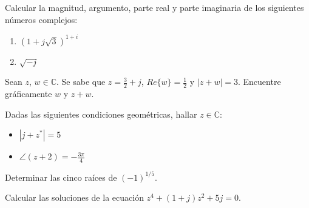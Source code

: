 \begin{ejercicio}
    Calcular la magnitud, argumento, parte real y parte imaginaria de los siguientes números complejos:
    \begin{enumerate}
        \item $(1+j\sqrt{3})^{1+i}$
        \item $\sqrt{-j}$
    \end{enumerate}
\end{ejercicio}

\begin{ejercicio}
    Sean $z$, $w \in \mathbb{C}$. Se sabe que $z=\frac{3}{2}+j$, $\textit{Re}\{w\} = \frac{1}{2}$ y $|z+w|=3$. Encuentre gráficamente $w$ y $z+w$.
\end{ejercicio}

\begin{ejercicio}
    Dadas las siguientes condiciones geométricas, hallar $z \in \mathbb{C}$:
    \begin{itemize}
        \item $|j+z^*| = 5$
        \item $\angle(z+2) = -\frac{3\pi}{4}$
    \end{itemize}
\end{ejercicio}

\begin{ejercicio}
    Determinar las cinco raíces de $(-1)^{1/5}$.
\end{ejercicio}

\begin{ejercicio}
    Calcular las soluciones de la ecuación $z^4+(1+j)z^2+5j=0$.
\end{ejercicio}

